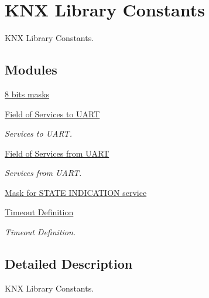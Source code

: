 \hypertarget{group___k_n_x___lib___constants}{}\section{K\+NX Library Constants}
\label{group___k_n_x___lib___constants}


K\+NX Library Constants.  


\subsection*{Modules}
\begin{DoxyCompactItemize}
\item 
\hyperlink{group_____bits___masks}{8 bits masks}
\item 
\hyperlink{group___u_a_r_t___control___to}{Field of Services to U\+A\+RT}
\begin{DoxyCompactList}\small\item\em Services to U\+A\+RT. \end{DoxyCompactList}\item 
\hyperlink{group___u_a_r_t___control___from}{Field of Services from U\+A\+RT}
\begin{DoxyCompactList}\small\item\em Services from U\+A\+RT. \end{DoxyCompactList}\item 
\hyperlink{group___u_a_r_t___control___mask}{Mask for S\+T\+A\+T\+E I\+N\+D\+I\+C\+A\+T\+I\+O\+N service}
\item 
\hyperlink{group___k_n_x___timeout}{Timeout Definition}
\begin{DoxyCompactList}\small\item\em Timeout Definition. \end{DoxyCompactList}\end{DoxyCompactItemize}


\subsection{Detailed Description}
K\+NX Library Constants. 

